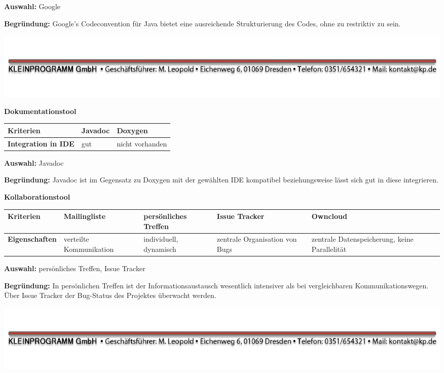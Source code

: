 \documentclass[12pt]{article}
\begin{document}
\textbf{Auswahl:} Google

\textbf{Begründung:} Google's Codeconvention für Java bietet eine ausreichende Strukturierung des Codes, ohne zu restriktiv zu sein.

\vspace*{30mm}
\vspace*{\fill}
\includegraphics[scale=0.9]{footer.pdf}
\thispagestyle{empty}




\textbf{Dokumentationstool}

\begin{tabularx}{\textwidth}{|X|X|X|}\hline
 \textbf{Kriterien}&\textbf{Javadoc}&\textbf{Doxygen}\\ \hline
 \textbf{Integration in IDE}&gut&nicht vorhanden\\ \hline
\end{tabularx}

\vspace*{3mm}

\textbf{Auswahl:} Javadoc

\textbf{Begründung:} Javadoc ist im Gegensatz zu Doxygen mit der gewählten IDE kompatibel beziehungsweise lässt sich gut in diese integrieren.
 \vspace*{10mm}

\textbf{Kollaborationstool}

\begin{tabularx}{\textwidth}{|X|X|X|X|X|}\hline
 \textbf{Kriterien}&\textbf{Mailingliste}&\textbf{persönliches Treffen}&\textbf{Issue Tracker}&\textbf{Owncloud}\\ \hline
 \textbf{Eigenschaften}&verteilte Kommunikation&individuell, dynamisch&zentrale Organisation von Bugs&zentrale Datenspeicherung, keine Parallelität\\ \hline
\end{tabularx}

\vspace*{3mm}

\textbf{Auswahl:} persönliches Treffen, Issue Tracker

\textbf{Begründung:} In persönlichen Treffen ist der Informationsaustausch wesentlich intensiver als bei vergleichbaren Kommunikationswegen. Über Issue Tracker der Bug-Status des Projektes überwacht werden.


\vspace*{\fill}
\includegraphics[scale=0.9]{footer.pdf}
\thispagestyle{empty}
\end{document}
